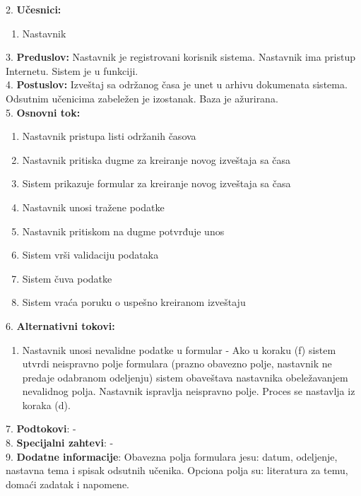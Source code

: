 \documentclass{article}
\begin{document}
2. \textbf{Učesnici:}
\begin{enumerate} [label=(\alph*)]
\item Nastavnik
\end{enumerate} 

3. \textbf{Preduslov:} Nastavnik je registrovani korisnik sistema. Nastavnik ima pristup Internetu. Sistem je u funkciji. \\

4. \textbf{Postuslov:} Izveštaj sa održanog časa je unet u arhivu dokumenata sistema. Odsutnim učenicima zabeležen je izostanak. Baza je ažurirana. \\

5. \textbf{Osnovni tok:} 
\begin{enumerate} [label=(\alph*)]
\item Nastavnik pristupa listi održanih časova
\item Nastavnik pritiska dugme za kreiranje novog izveštaja sa časa
\item Sistem prikazuje formular za kreiranje novog izveštaja sa časa
\item Nastavnik unosi tražene podatke 
\item Nastavnik pritiskom na dugme potvrđuje unos
\item Sistem vrši validaciju podataka
\item Sistem čuva podatke
\item Sistem vraća poruku o uspešno kreiranom izveštaju
\end{enumerate}

6. \textbf{Alternativni tokovi:}
\begin{enumerate} [label=(\roman*)]
\item Nastavnik unosi nevalidne podatke u formular - Ako u koraku (f) sistem utvrdi neispravno polje formulara (prazno obavezno polje, nastavnik ne predaje odabranom odeljenju) sistem obaveštava nastavnika obeležavanjem nevalidnog polja. Nastavnik ispravlja neispravno polje. Proces se nastavlja iz koraka (d).
\end{enumerate}

7. \textbf{Podtokovi}: - \\

8. \textbf{Specijalni zahtevi}: - \\

9. \textbf{Dodatne informacije}: Obavezna polja formulara jesu: datum, odeljenje, nastavna tema i spisak odsutnih učenika. Opciona polja su: literatura za temu, domaći zadatak i napomene. \\
\end{document}
